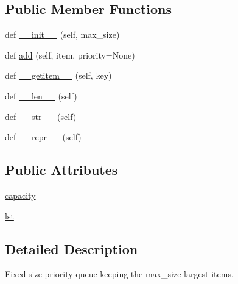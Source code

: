 \subsection*{Public Member Functions}
\begin{DoxyCompactItemize}
\item 
def \hyperlink{classparlai_1_1agents_1_1ir__baseline_1_1ir__baseline_1_1MaxPriorityQueue_a33145693ab371c9f96cb8339fd4a39c3}{\+\_\+\+\_\+init\+\_\+\+\_\+} (self, max\+\_\+size)
\item 
def \hyperlink{classparlai_1_1agents_1_1ir__baseline_1_1ir__baseline_1_1MaxPriorityQueue_ad55d735d26bc038f7a552b1789036033}{add} (self, item, priority=None)
\item 
def \hyperlink{classparlai_1_1agents_1_1ir__baseline_1_1ir__baseline_1_1MaxPriorityQueue_a7830895ac98617df15af4ba0fb991a05}{\+\_\+\+\_\+getitem\+\_\+\+\_\+} (self, key)
\item 
def \hyperlink{classparlai_1_1agents_1_1ir__baseline_1_1ir__baseline_1_1MaxPriorityQueue_a7b1b8f3a2f17a0d4bd3c202bc3bdee78}{\+\_\+\+\_\+len\+\_\+\+\_\+} (self)
\item 
def \hyperlink{classparlai_1_1agents_1_1ir__baseline_1_1ir__baseline_1_1MaxPriorityQueue_a16e80c3c0f52236d14e5e1813a7c9c52}{\+\_\+\+\_\+str\+\_\+\+\_\+} (self)
\item 
def \hyperlink{classparlai_1_1agents_1_1ir__baseline_1_1ir__baseline_1_1MaxPriorityQueue_a0d0d7db0cf816039ca69cba4bf481f01}{\+\_\+\+\_\+repr\+\_\+\+\_\+} (self)
\end{DoxyCompactItemize}
\subsection*{Public Attributes}
\begin{DoxyCompactItemize}
\item 
\hyperlink{classparlai_1_1agents_1_1ir__baseline_1_1ir__baseline_1_1MaxPriorityQueue_a7d35dfdbd0e65d15b701e1b3275e6d89}{capacity}
\item 
\hyperlink{classparlai_1_1agents_1_1ir__baseline_1_1ir__baseline_1_1MaxPriorityQueue_a9e5cc3e3c70101f251f2d19cf936aa4e}{lst}
\end{DoxyCompactItemize}


\subsection{Detailed Description}
\begin{DoxyVerb}Fixed-size priority queue keeping the max_size largest items.\end{DoxyVerb}
 


